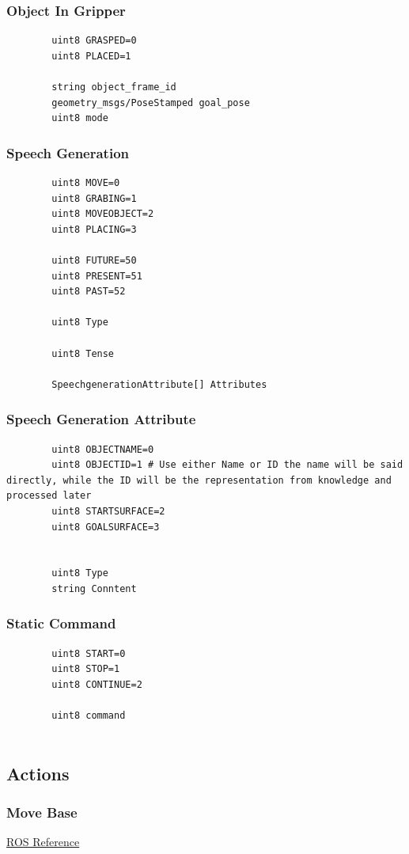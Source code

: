 \documentclass[main.tex]{subfiles}
\begin{document}
		\subsubsection{Object In Gripper}
		\begin{lstlisting}
		uint8 GRASPED=0
		uint8 PLACED=1
		
		string object_frame_id
		geometry_msgs/PoseStamped goal_pose
		uint8 mode
		\end{lstlisting}
		\subsubsection{Speech Generation}
		\begin{lstlisting}
		uint8 MOVE=0
		uint8 GRABING=1
		uint8 MOVEOBJECT=2
		uint8 PLACING=3
		
		uint8 FUTURE=50
		uint8 PRESENT=51
		uint8 PAST=52
		
		uint8 Type
		
		uint8 Tense
		
		SpeechgenerationAttribute[] Attributes
		\end{lstlisting}
		\subsubsection{Speech Generation Attribute}
		\begin{lstlisting}
		uint8 OBJECTNAME=0
		uint8 OBJECTID=1 # Use either Name or ID the name will be said directly, while the ID will be the representation from knowledge and processed later
		uint8 STARTSURFACE=2
		uint8 GOALSURFACE=3
		
		
		uint8 Type
		string Conntent
		\end{lstlisting}
		\subsubsection{Static Command}
		\begin{lstlisting}
		uint8 START=0
		uint8 STOP=1
		uint8 CONTINUE=2
		
		uint8 command
		
		\end{lstlisting}
		\subsection{Actions}
			\subsubsection{Move Base}
			\href{http://wiki.ros.org/move_base_msgs/MoveBaseAction}{ROS Reference}
\end{document}
